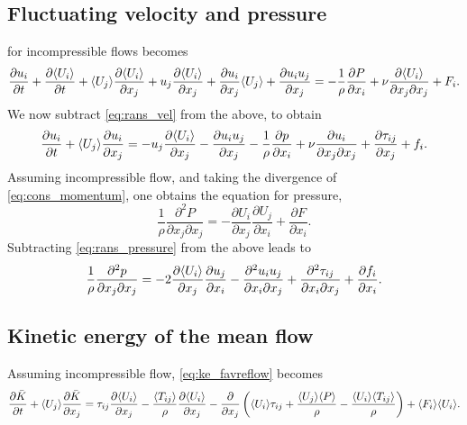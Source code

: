 \documentclass[oneside,a4paper,11pt]{report}
\begin{document}
\subsection{Fluctuating velocity and pressure}
 for incompressible flows becomes
\begin{equation}
    \frac{\partial u_i}{\partial t} + \frac{\partial \langle U_i \rangle}{\partial t} + \langle U_j \rangle \frac{\partial \langle U_i \rangle}{\partial x_j} + u_j \frac{\partial \langle U_i \rangle}{\partial x_j} + \frac{\partial u_i}{\partial x_j} \langle U_j \rangle + \frac{\partial u_i u_j}{\partial x_j} = -\frac{1}{\rho}\frac{\partial P}{\partial x_i} + \nu \frac{\partial \langle U_i \rangle}{\partial x_j \partial x_j} + F_i.
\end{equation}
We now subtract \cref{eq:rans_vel} from the above, to obtain
\begin{equation}
\label{eq:vel_fluc}
    \frac{\partial u_i}{\partial t} + \langle U_j \rangle \frac{\partial u_i}{\partial x_j} = -u_j \frac{\partial \langle U_i \rangle}{\partial x_j} - \frac{\partial u_i u_j}{\partial x_j} - \frac{1}{\rho}\frac{\partial p}{\partial x_i} + \nu \frac{\partial u_i}{\partial x_j \partial x_j} + \frac{\partial \tau_{ij}}{\partial x_j} + f_i.
\end{equation}
Assuming incompressible flow, and taking the divergence of \cref{eq:cons_momentum}, one obtains the equation for pressure,
\begin{equation}
\frac{1}{\rho} \frac{\partial^2 P}{\partial x_j \partial x_j} = -\frac{\partial U_i}{\partial x_j}\frac{\partial U_j}{\partial x_i} + \frac{\partial F}{\partial x_i}.
\end{equation}
Subtracting \cref{eq:rans_pressure} from the above leads to
\begin{equation}
\label{press_fluc}
\frac{1}{\rho} \frac{\partial^2 p}{\partial x_j \partial x_j} = -2 \frac{\partial \langle U_i \rangle}{\partial x_j} \frac{\partial u_j}{\partial x_i} - \frac{\partial^2 u_i u_j}{\partial x_i \partial x_j} + \frac{\partial^2 \tau_{ij}}{\partial x_i \partial x_j} + \frac{\partial f_i}{\partial x_i}.
\end{equation}

\subsection{Kinetic energy of the mean flow}
Assuming incompressible flow, \cref{eq:ke_favreflow} becomes
\begin{equation}
\label{eq:ke_ransflow}
\frac{\partial \bar{K} }{\partial t} + \langle U_j \rangle \frac{ \partial \bar{K} }{\partial x_j} = \tau_{ij} \frac{\partial \langle U_i \rangle}{\partial x_j} - \frac{ \langle T_{ij} \rangle }{ \rho } \frac{ \partial \langle U_i \rangle }{\partial x_j} -  \frac{\partial}{\partial x_j} \left ( \langle U_i \rangle \tau_{ij} + \frac{ \langle U_j \rangle \langle P \rangle }{\rho} - \frac{ \langle U_i \rangle \langle T_{ij} \rangle }{\rho} \right ) + \langle F_i \rangle \langle U_i \rangle.
\end{equation}
\end{document}
